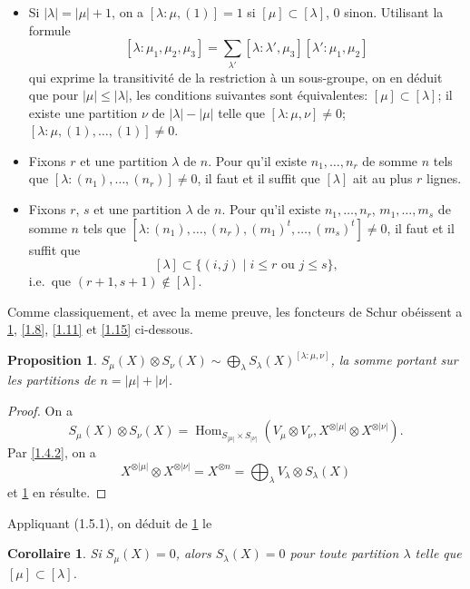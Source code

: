 \documentclass[11pt,a4paper]{article}
\theoremstyle{plain}
\newtheorem{proposition}[theorem]{Proposition}
\newtheorem{corollary}[theorem]{Corollaire}
\theoremstyle{definition}
\DeclareMathOperator{\Hom}{Hom}
\begin{document}
\begin{itemize}
\item[(1.5.1)] Si $|\lambda|=|\mu|+1$, on a $[\lambda:\mu,(1)]=1$ si $[\mu]\subset[\lambda]$, $0$ sinon. Utilisant la formule
\[
[\lambda:\mu_1,\mu_2,\mu_3]=\sum_{\lambda'}[\lambda:\lambda',\mu_3][\lambda':\mu_1,\mu_2]
\]
qui exprime la transitivit\'e de la restriction \`a un sous-groupe, on en d\'eduit que pour $|\mu|\leq|\lambda|$, les conditions suivantes sont \'equivalentes: $[\mu]\subset[\lambda]$; il existe une partition $\nu$ de $|\lambda|-|\mu|$ telle que $[\lambda:\mu,\nu]\neq0$; $[\lambda:\mu,(1),\ldots,(1)]\neq0$.
\item[(1.5.2)] Fixons $r$ et une partition $\lambda$ de $n$. Pour qu'il existe $n_1,\ldots,n_r$ de somme $n$ tels que $[\lambda:(n_1),\ldots,(n_r)]\neq0$, il faut et il suffit que $[\lambda]$ ait au plus $r$ lignes.
\item[(1.5.3)] Fixons $r$, $s$ et une partition $\lambda$ de $n$. Pour qu'il existe $n_1,\ldots,n_r$, $m_1,\ldots,m_s$ de somme $n$ tels que $[\lambda:(n_1),\ldots,(n_r),(m_1)^t,\ldots,(m_s)^t]\neq0$, il faut et il suffit que
\[
[\lambda]\subset\{(i,j)\mid i\leq r\text{ ou }j\leq s\},
\]
i.e.~que $(r+1,s+1)\notin[\lambda]$.
\end{itemize}

Comme classiquement, et avec la meme preuve, les foncteurs de Schur ob\'eissent a \ref{1.6}, \ref{1.8}, \ref{1.11} et \ref{1.15} ci-dessous.

\begin{proposition}\label{1.6}
$S_\mu(X)\otimes S_\nu(X)\sim\bigoplus_\lambda S_\lambda(X)^{[\lambda:\mu,\nu]}$, la somme portant sur les partitions de $n=|\mu|+|\nu|$.
\end{proposition}

\begin{proof}
On a
\[
S_\mu(X)\otimes S_\nu(X)=\Hom_{S_{|\mu|}\times S_{|\nu|}}(V_\mu\otimes V_\nu,X^{\otimes|\mu|}\otimes X^{\otimes|\nu|}).
\]
Par \ref{1.4.2}, on a
\[
X^{\otimes|\mu|}\otimes X^{\otimes|\nu|}=X^{\otimes n}=\bigoplus_\lambda V_\lambda\otimes S_\lambda(X)
\]
et \ref{1.6} en r\'esulte.
\end{proof}

Appliquant (1.5.1), on d\'eduit de \ref{1.6} le

\begin{corollary}\label{1.7}
Si $S_\mu(X)=0$, alors $S_\lambda(X)=0$ pour toute partition $\lambda$ telle que $[\mu]\subset[\lambda]$.
\end{corollary}
\end{document}
